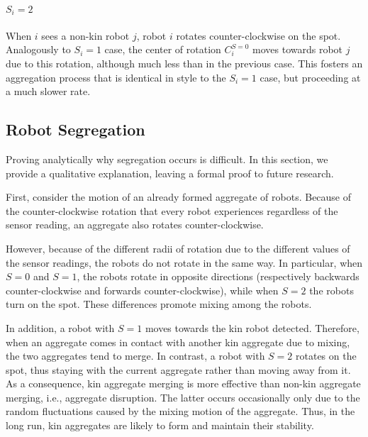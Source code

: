 \documentclass[letterpaper, 10 pt, conference]{ieeeconf}
\begin{document}
\paragraph{$S_i = 2$}
When $i$ sees a non-kin robot $j$, robot $i$ rotates counter-clockwise on the
spot. Analogously to $S_i = 1$ case, the center of rotation $C^{S=0}_i$ moves
towards robot $j$ due to this rotation, although much less than in the previous
case. This fosters an aggregation process that is identical in style to the
$S_i = 1$ case, but proceeding at a much slower rate.

\subsection{Robot Segregation}
\label{subsec:analysis_aggregate}

Proving analytically why segregation occurs is difficult. In this section, we
provide a qualitative explanation, leaving a formal proof to future research.

First, consider the motion of an already formed aggregate of robots. Because of
the counter-clockwise rotation that every robot experiences regardless of the
sensor reading, an aggregate also rotates counter-clockwise.

However, because of the different radii of rotation due to the different values
of the sensor readings, the robots do not rotate in the same way. In particular,
when $S=0$ and $S=1$, the robots rotate in opposite directions (respectively
backwards counter-clockwise and forwards counter-clockwise), while when $S=2$
the robots turn on the spot. These differences promote mixing among the robots.

In addition, a robot with $S=1$ moves towards the kin robot detected. Therefore,
when an aggregate comes in contact with another kin aggregate due to mixing, the
two aggregates tend to merge. In contrast, a robot with $S=2$ rotates on the
spot, thus staying with the current aggregate rather than moving away from
it. As a consequence, kin aggregate merging is more effective than non-kin
aggregate merging, i.e., aggregate disruption. The latter occurs occasionally
only due to the random fluctuations caused by the mixing motion of the
aggregate. Thus, in the long run, kin aggregates are likely to form and maintain
their stability.



\end{document}
